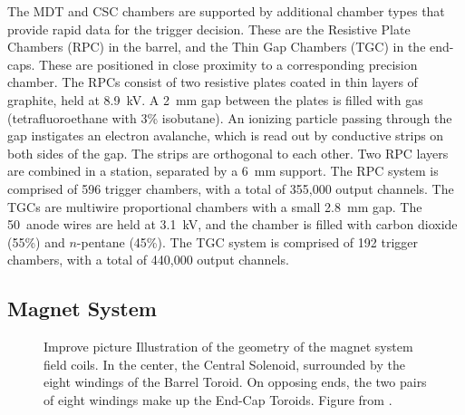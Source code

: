 The MDT and CSC chambers are supported by additional chamber types that provide rapid data for the trigger decision.
These are the Resistive Plate Chambers (RPC) in the barrel, and the Thin Gap Chambers (TGC) in the end-caps.
These are positioned in close proximity to a corresponding precision chamber.
The RPCs consist of two resistive plates coated in thin layers of graphite, held at 8.9~kV.
A 2~mm gap between the plates is filled with gas (tetrafluoroethane with 3\% isobutane).
An ionizing particle passing through the gap instigates an electron avalanche, which is read out by conductive strips on both sides of the gap.
The strips are orthogonal to each other.
Two RPC layers are combined in a station, separated by a 6~mm support.
The RPC system is comprised of 596 trigger chambers, with a total of 355,000 output channels.
The TGCs are multiwire proportional chambers with a small 2.8~mm gap.
The 50~\um anode wires are held at 3.1~kV, and the chamber is filled with carbon dioxide (55\%) and $n$-pentane (45\%).
The TGC system is comprised of 192 trigger chambers, with a total of 440,000 output channels.
\cite{muonTdr}

\subsection{Magnet System}

\begin{figure}[h!]
\captionsetup[subfigure]{position=b}
\centering
{}
\caption{{\color{red} Improve picture} Illustration of the geometry of the magnet system field coils. In the center, the Central Solenoid, surrounded by the eight windings of the Barrel Toroid. On opposing ends, the two pairs of eight windings make up the End-Cap Toroids. Figure from \cite{magnetTdr}.}
\label{fig:atlasMagnets}
\end{figure}

